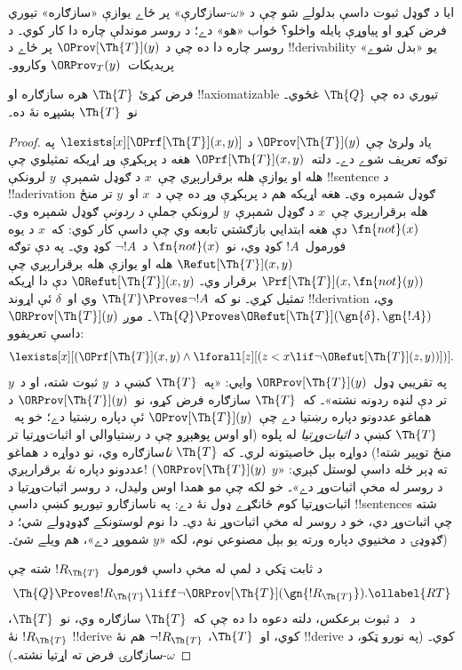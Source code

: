 \documentclass[../../../include/open-logic-section]{subfiles}
\begin{document}


ايا د ګوډل ثبوت داسې بدلولے شو چې د «$\omega$-سازګارې» پر ځاے
يوازې «سازګاره» تيوري فرض کړو او پياوړې پايله واخلو؟ ځواب «هو» دے؛
د روسر موندلې چاره دا کار کوي۔ د روسر چاره دا ده چې د
$\OProv[\Th{T}](y)$ پر ځاے د !!{derivability} يو «بدل شوے»
پريديکات~$\ORProv_T(y)$ وکاروو۔

\begin{thm}
فرض کړئ $\Th{T}$ هره سازګاره او !!{axiomatizable} تيوري ده چې
$\Th{Q}$ غځوي۔ نو~$\Th{T}$ بشپړه نۀ ده۔
\end{thm}

\begin{proof}
ياد ولرئ چې $\OProv[\Th{T}](y)$ د
$\lexists[x][\OPrf[\Th{T}](x,
  y)]$ په توګه تعريف شوے دے۔ دلته~$\OPrf[\Th{T}](x, y)$ هغه
د پرېکړې وړ اړيکه تمثيلوي چې هله او يوازې هله برقرارېږي چې~$x$
د ګوډل شمېرې~$y$ لرونکې !!{sentence} د !!a{derivation} ګوډل
شمېره وي۔ هغه اړيکه هم د پرېکړې وړ ده چې د~$x$ او~$y$ تر منځ
هله برقرارېږي چې~$x$ د ګوډل شمېرې~$y$ لرونکې جملې د
\emph{ردونې} ګوډل شمېره وي۔ $\fn{not}(x)$ دې هغه ابتدايي
بازګشتي تابعه وي چې داسې کار کوي: که~$x$ د يوه فورمول~$!A$ کوډ
وي، نو~$\fn{not}(x)$ د~$\lnot
!A$ کوډ وي۔ په دې توګه $\Refut[\Th{T}](x, y)$ هله او يوازې هله
برقرارېږي چې $\Prf[\Th{T}](x, \fn{not}(y))$ برقرار وي۔
$\ORefut[\Th{T}](x, y)$ دې دا اړيکه تمثيل کړي۔ نو که
$\Th{T} \Proves \lnot !A$ وي او~$\delta$ ئې اړوند !!{derivation}
وي، $\Th{Q} \Proves
\ORefut[\Th{T}](\gn{\delta}, \gn{!A})$۔ موږ
$\ORProv[\Th{T}](y)$ داسې تعريفوو:
\[
\lexists[x][(\OPrf[\Th{T}](x,y) \land \lforall[z][(z < x \lif \lnot
  \ORefut[\Th{T}](z,y))])].
\]
په تقريبي ډول~$\ORProv[\Th{T}](y)$ وايي: «په~$\Th{T}$ کښې د~$y$
ثبوت شته، او د~$y$ تر دې لنډه ردونه نشته»۔ که~$\Th{T}$ سازګاره
فرض کړو، نو~$\ORProv[\Th{T}](y)$ د هماغو عددونو دپاره رښتيا دے
چې~$\OProv[\Th{T}](y)$ ئې دپاره رښتيا دے؛ خو په~$\Th{T}$ کښې د
\emph{اثبات‌وړتيا} له پلوه (او اوس پوهېږو چې د رښتياوالي او
اثبات‌وړتيا تر منځ توپير شته!) دواړه بېل خاصيتونه لري۔ که
$\Th{T}$ \emph{نا}سازګاره وي، نو دواړه د هماغو عددونو دپاره
\emph{نۀ} برقرارېږي!{} ($\ORProv[\Th{T}](y)$ ته ډېر ځله داسې
لوستل کېږي: «$y$ د روسر له مخې اثبات‌وړ دے»۔ خو لکه چې مو همدا
اوس وليدل، د روسر اثبات‌وړتيا د اثبات‌وړتيا کوم ځانګړے ډول نۀ
دے: په ناسازګارو تيوريو کښې داسې !!{sentence}s شته چې اثبات‌وړ
دي، خو د روسر له مخې اثبات‌وړ نۀ دي۔ دا نوم لوستونکے ګډوډولے شي؛
د ګډوډۍ د مخنيوي دپاره ورته يو بېل مصنوعي نوم، لکه «$y$ شمووړ دے»، هم
ويلے شئ۔)

د ثابت ټکي د لمې له مخې داسې فورمول~$!R_\Th{T}$ شته چې
\begin{equation}
  \Th{Q} \Proves !R_\Th{T} \liff \lnot \ORProv[\Th{T}](\gn{!R_\Th{T}}).
  \ollabel{RT}
\end{equation}
د~ د ثبوت برعکس، دلته دعوه
دا ده چې که~$\Th{T}$ سازګاره وي، نو~$\Th{T}$، $!R_\Th{T}$
نۀ !!{derive} کوي، او~$\Th{T}$، $\lnot !R_\Th{T}$ هم نۀ !!{derive} کوي۔
(په نورو ټکو، د $\omega$-سازګارۍ فرض ته اړتيا نشته۔)


\end{proof}
\end{document}
